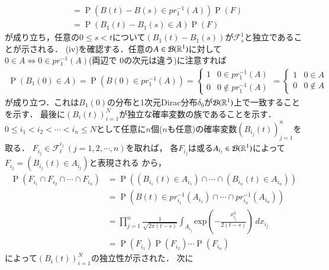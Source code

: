 \begin{prf}
\begin{description}
\begin{align}
			&= \operatorname{P}\left( B(t) - B(s) \in pr_1^{-1}(A)\right) \operatorname{P}(F) \\
			&= \operatorname{P}\left( B_1(t) - B_1(s) \in A\right) \operatorname{P}(F)
		\end{align}
		が成り立ち，任意の$0 \leq s < t$について$(B_1(t) - B_1(s))$が$\mathcal{F}_s^1$と独立であることが示される．
		(iv)を確認する．任意の$A \in \mathcal{B}(\mathbb{R}^1)$に対して$0 \in A \Leftrightarrow 0 \in pr_1^{-1}(A)$(両辺で
		0の次元は違う)に注意すれば
		\begin{align}
			\operatorname{P}(B_1(0) \in A) = \operatorname{P}\left(B(0) \in pr_1^{-1}(A)\right)
			= \begin{cases}
				1 & 0 \in pr_1^{-1}(A) \\
				0 & 0 \notin pr_1^{-1}(A)
			\end{cases}
			= \begin{cases}
				1 & 0 \in A \\
				0 & 0 \notin A
			\end{cases}
		\end{align}
		が成り立つ．これは$B_1(0)$の分布と1次元Dirac分布$\delta_0$が$\mathcal{B}(\mathbb{R}^1)$上で一致することを示す．
		最後に$(B_i(t))_{i=1}^{N}$が独立な確率変数の族であることを示す．
		$0 \leq i_1 < i_2 < \cdots < i_n \leq N$として任意に$n$個($n$も任意)の確率変数$\left(B_{i_j}(t)\right)_{j=1}^{n}$を取る．
		$F_{i_j} \in \mathcal{F}_t^{i_j}\ (j=1,2,\cdots,n)$を取れば，
		各$F_{i_j}$は或る$A_{i_j} \in \mathcal{B}(\mathbb{R}^1)$によって$F_{i_j} = \left(B_{i_j}(t) \in A_{i_j} \right)$と表現される
		から，
		\begin{align}
			\operatorname{P}\left(F_{i_1} \cap F_{i_2} \cap \cdots \cap F_{i_n}\right)
			&= \operatorname{P}\left( \left(B_{i_1}(t) \in A_{i_1} \right) \cap \cdots \cap \left(B_{i_n}(t) \in A_{i_n} \right)\right) \\
			&= \operatorname{P}\left( B(t) \in pr_{i_1}^{-1}(A_{i_1}) \cap \cdots \cap pr_{i_n}^{-1}(A_{i_n})\right) \\
			&= \prod_{j=1}^{n} \frac{1}{\sqrt{2 \pi (t-s)}} \int_{A_{i_j}} \mathrm{exp} \left( -\frac{x_{i_j}^2}{2(t-s)} \right)\, dx_{i_j} \\
			&= \operatorname{P}\left(F_{i_1}\right) \operatorname{P}\left(F_{i_2}\right) \cdots \operatorname{P}\left(F_{i_n}\right)
		\end{align}
		によって$(B_i(t))_{i=1}^{N}$の独立性が示された．
		次に
\end{description}
\end{prf}
